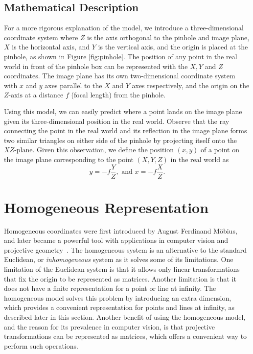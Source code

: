 \documentclass[11pt, oneside, reqno]{book}
\begin{document}
\subsection{Mathematical Description}

For a more rigorous explanation of the model, we introduce a three-dimensional coordinate system where $Z$ is the axis orthogonal to the pinhole and image plane, $X$ is the horizontal axis, and $Y$ is the vertical axis, and the origin is placed at the pinhole, as shown in Figure \ref{fig:pinhole}. The position of any point in the real world in front of the pinhole box can be represented with the $X, Y$ and $Z$ coordinates. The image plane has its own two-dimensional coordinate system with $x$ and $y$ axes parallel to the $X$ and $Y$ axes respectively, and the origin on the $Z\text{-axis}$ at a distance $f$ (focal length) from the pinhole. 

Using this model, we can easily predict where a point lands on the image plane given its three-dimensional position in the real world. Observe that the ray connecting the point in the real world and its reflection in the image plane forms two similar triangles on either side of the pinhole by projecting itself onto the $XZ\text{-plane}$. Given this observation, we define the position $(x,y)$ of a point on the image plane corresponding to the point $(X,Y,Z)$ in the real world as
\[
y = -f\frac{Y}{Z}, \text{ and } x = -f\frac{X}{Z}.
\]









\section{Homogeneous Representation}
\label{sec:homogeneousRepresent}
Homogeneous coordinates were first introduced by August Ferdinand M\"{o}bius, and later became a powerful tool with applications in computer vision and projective geometry~\cite{allardice1891barycentric, smith1896history}. The homogeneous system is an alternative to the standard Euclidean, or \textit{inhomogeneous} system as it solves some of its limitations. One limitation of the Euclidean system is that it allows only linear transformations that fix the origin to be represented as matrices. Another limitation is that it does not have a finite representation for a point or line at infinity. The homogeneous model solves this problem by introducing an extra dimension, which provides a convenient representation for points and lines at infinity, as described later in this section. Another benefit of using the homogeneous model, and the reason for its prevalence in computer vision, is that projective transformations can be represented as matrices, which offers a convenient way to perform such operations.
\end{document}
